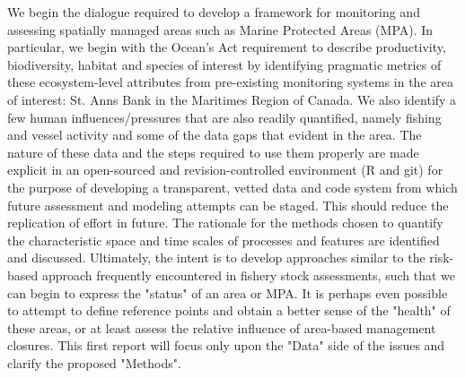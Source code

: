 \documentclass[letterpaper,portrait,11pt]{scrartcl}
\numberwithin{equation}{section}    %
\numberwithin{figure}{section}    %
\numberwithin{table}{section}       %
\begin{document}
We begin the dialogue required to develop a framework for monitoring and assessing spatially managed areas such as Marine Protected Areas (MPA). In particular, we begin with the Ocean's Act requirement to describe productivity, biodiversity, habitat and species of interest by identifying pragmatic metrics of these ecosystem-level attributes from pre-existing monitoring systems in the area of interest: St. Anns Bank in the Maritimes Region of Canada. We also identify a few human influences/pressures that are also readily quantified, namely fishing and vessel activity and some of the data gaps that evident in the area. The nature of these data and the steps required to use them properly are made explicit in an open-sourced and revision-controlled environment (R and git) for the purpose of developing a transparent, vetted data and code system from which future assessment and modeling attempts can be staged. This should reduce the replication of effort in future. The rationale for the methods chosen to quantify the characteristic space and time scales of processes and features are identified and discussed. Ultimately, the intent is to develop approaches similar to the risk-based approach frequently encountered in fishery stock assessments, such that we can begin to express the "status" of an area or MPA. It is perhaps even possible to attempt to define reference points and obtain a better sense of the "health" of these areas, or at least assess the relative influence of area-based management closures. This first report will focus only upon the "Data" side of the issues and clarify the proposed "Methods". 









% 
% 

\setlength{\parskip}{12 pt} %
\setlength{\parindent}{0cm}
\setlength{\floatsep}{2cm}
\setcounter{tocdepth}{2} %
\setcounter{secnumdepth}{3} %

\renewcommand{\contentsname}{Table of contents}
\newpage
\clearpage                       %
{                                %
  \pagestyle{empty}              %

  \tableofcontents
}
\end{document}
